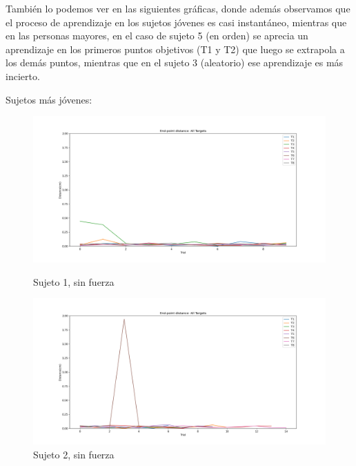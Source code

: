 \documentclass[a4paper,11pt, oneside]{book}
\begin{document}
También lo podemos ver en las siguientes gráficas, donde además observamos que el proceso de aprendizaje en los sujetos jóvenes es casi instantáneo, mientras que en las personas mayores, en el caso de sujeto 5 (en orden) se aprecia un aprendizaje en los primeros puntos objetivos (T1 y T2) que luego se extrapola a los demás puntos, mientras que en el sujeto 3 (aleatorio) ese aprendizaje es más incierto.

Sujetos más jóvenes:
\\
\begin{figure}[h]
	\begin{minipage}[b]{0.5\linewidth}
		\centering
		\includegraphics[width=\linewidth]{sujeto1/no_force/evolution_distance}
		\caption{Sujeto 1, sin fuerza}
		\label{fig:figura1}
	\end{minipage}
	\hspace{0.5cm}
	\begin{minipage}[b]{0.5\linewidth}
		\centering
		\includegraphics[width=\linewidth]{sujeto2/no_force/evolution_distance}
		\caption{Sujeto 2, sin fuerza}
		\label{fig:figura2}
	\end{minipage}
\end{figure}
\end{document}
